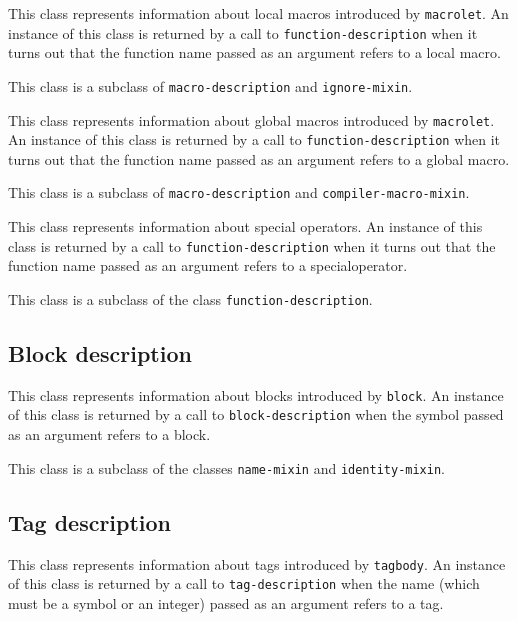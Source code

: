 This class represents information about local macros introduced by
\texttt{macrolet}.  An instance of this class is returned by a call to
\texttt{function-description} when it turns out that the function name passed
as an argument refers to a local macro.

This class is a subclass of \texttt{macro-description} and \texttt{ignore-mixin}.

{\footnotesize
{}
}

This class represents information about global macros introduced by
\texttt{macrolet}.  An instance of this class is returned by a call to
\texttt{function-description} when it turns out that the function name passed
as an argument refers to a global macro.

This class is a subclass of \texttt{macro-description} and
\texttt{compiler-macro-mixin}.

{\footnotesize
{}
}

This class represents information about special operators.  An
instance of this class is returned by a call to \texttt{function-description}
when it turns out that the function name passed as an argument refers
to a specialoperator.

This class is a subclass of the class \texttt{function-description}.

\subsection{Block description}
\label{sec-instantiable-classes-block-desciption}

{\footnotesize
{}
}

This class represents information about blocks introduced by
\texttt{block}.  An instance of this class is returned by a call to
\texttt{block-description} when the symbol passed as an argument refers to a
block.

This class is a subclass of the classes \texttt{name-mixin} and
\texttt{identity-mixin}.

\subsection{Tag description}
\label{sec-instantiable-classes-tag-desciption}

{\footnotesize
{}
}

This class represents information about tags introduced by
\texttt{tagbody}.  An instance of this class is returned by a call to
\texttt{tag-description} when the name (which must be a symbol or an integer)
passed as an argument refers to a tag.

